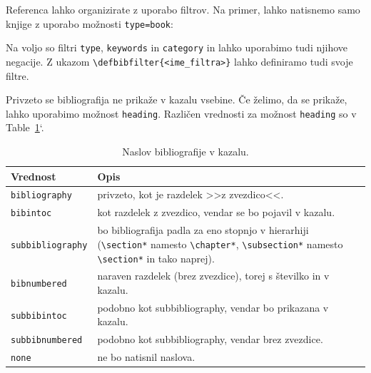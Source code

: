 \begin{example}\label{eg_literatura_2}\end{example}Referenca lahko organizirate z uporabo filtrov.
Na primer, lahko natisnemo samo knjige z uporabo možnosti \texttt{type=book}:

\begin{example}\label{eg_literatura_3}\end{example}Na voljo so filtri \texttt{type}, \texttt{keywords} in \texttt{category} in lahko uporabimo tudi njihove negacije. Z ukazom \texttt{{\textbackslash}defbibfilter\{\textless ime\_filtra\textgreater \}} lahko definiramo tudi svoje filtre.

\begin{example}\label{eg_literatura_4}\end{example}\begin{example}\label{eg_literatura_5}\end{example}Privzeto se bibliografija ne prikaže v kazalu vsebine. Če želimo, da se prikaže, lahko uporabimo možnost \texttt{heading}.
Različen vrednosti za možnost \texttt{heading} so v  Table~\ref{tab:heading_options}`.

\begin{table}
\centering
\caption[]{Naslov bibliografije v kazalu.}
\label{tab:heading_options}
\begin{tabular}{p{}p{}}
\toprule
Vrednost & Opis \\
\hline
\texttt{bibliography} & privzeto, kot je razdelek >>z zvezdico<<. \\
\texttt{bibintoc} & kot razdelek z zvezdico, vendar se bo pojavil v kazalu. \\
\texttt{subbibliography} & bo bibliografija padla za eno stopnjo v hierarhiji (\texttt{{\textbackslash}section*} namesto \texttt{{\textbackslash}chapter*}, \texttt{{\textbackslash}subsection*} namesto \texttt{{\textbackslash}section*} in tako naprej). \\
\texttt{bibnumbered} & naraven razdelek (brez zvezdice), torej s številko in v kazalu. \\
\texttt{subbibintoc} & podobno kot subbibliography, vendar bo prikazana v kazalu. \\
\texttt{subbibnumbered} & podobno kot subbibliography, vendar brez zvezdice. \\
\texttt{none} & ne bo natisnil naslova. \\
\bottomrule
\end{tabular}
\end{table}

